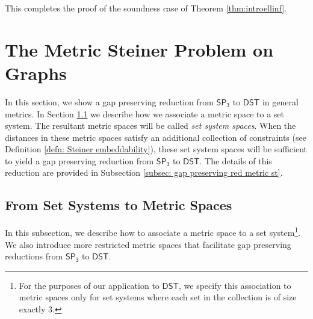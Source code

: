 \documentclass{theoretics}
\newcommand{\1}{\textbf{1}}
\newcommand{\setpT}{$\mathsf{SP_3}$\xspace}
\newcommand{\dst}{$\mathsf{DST}$\xspace}
\begin{document}
This completes the proof of the soundness case of Theorem \ref{thm:introellinf}.


\section{The Metric Steiner Problem on Graphs}\label{sec:metricspace}
In this section, we show a gap preserving reduction from \setpT to \dst in general metrics. In Section \ref{subsec: metric from sets} we describe how we associate a metric space to a set system. The resultant metric spaces will be called \textit{set system spaces}. When the distances in these metric spaces satisfy an additional collection of constraints (see Definition \ref{defn: Steiner embeddability}), these set system spaces will be sufficient to yield a gap preserving reduction from \setpT to \dst. The details of this reduction are provided in Subsection \ref{subsec: gap preserving red metric st}.

\subsection{From Set Systems to Metric Spaces} \label{subsec: metric from sets}
In this subsection, we describe how to associate a  metric space to a set system\footnote{For the purposes of our application to \dst, we specify this association to metric spaces only for  set systems where each set in the collection is of size exactly 3.}. We also introduce more restricted metric spaces that facilitate gap preserving reductions from \setpT to \dst.
\end{document}
